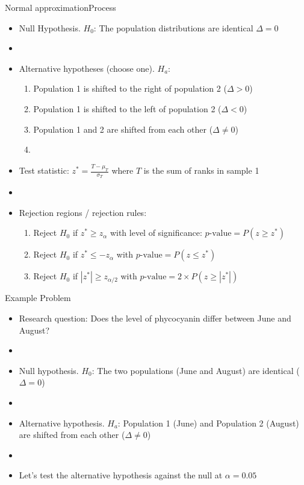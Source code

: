\documentclass[xcolor=dvipsnames]{beamer}
\begin{document}
\begin{frame}{Normal approximation}{Process}
\begin{itemize}
	\item Null Hypothesis. $H_0$: The population distributions are identical $\Delta = 0$ \pause
	\item[]
	\item Alternative hypotheses (choose one). $H_a$: \pause
	\begin{enumerate}
		\item Population 1 is shifted to the right of population 2 ($\Delta >0$) 
		\item Population 1 is shifted to the left of population 2 ($\Delta < 0$) 
		\item Population 1 and 2 are shifted from each other ($\Delta \neq 0$)  \pause
		\item[]
	\end{enumerate}
	\item Test statistic: $z^* =\frac{T- \mu_T}{\sigma_T}$ where $T$ is the sum of ranks in sample 1 \pause
	\item[]
	\item Rejection regions / rejection rules: \pause
	\begin{enumerate}
		\item Reject $H_0$ if $z^* \geq z_{\alpha}$ with level of significance: $p\text{-value}=P(z \geq z^*)$
		\item Reject $H_0$ if $z^* \leq -z_{\alpha}$ with $p\text{-value}=P(z \leq z^*)$
		\item Reject $H_0$ if $|z^*| \geq z_{\alpha/2}$ with $p\text{-value}=2 \times P(z \geq |z^*|)$
	\end{enumerate}
\end{itemize}
\end{frame}

\begin{frame}{Example Problem}
\begin{itemize}
	\item Research question: Does the level of phycocyanin differ between June and August? \pause
	\item[]
	\item Null hypothesis. $H_0$: The two populations (June and August) are identical ($\Delta = 0$) \pause
	\item[]
	\item Alternative hypothesis. $H_a$: Population 1 (June) and Population 2 (August) are shifted from each other ($\Delta \neq 0$) \pause
	\item[]
	\item Let's test the alternative hypothesis against the null at $\alpha = 0.05$
\end{itemize}
\end{frame}
\end{document}
